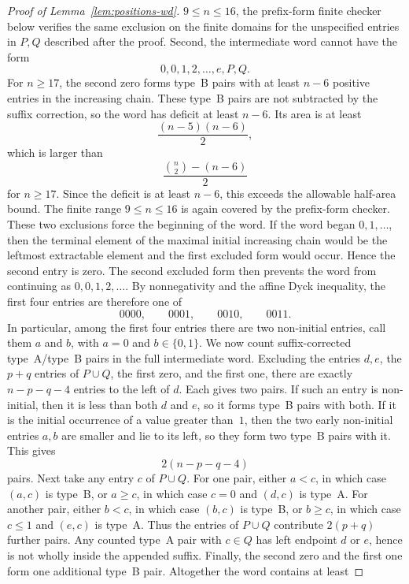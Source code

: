 \documentclass[11pt]{article}
\theoremstyle{plain}
\theoremstyle{definition}
\theoremstyle{remark}
\begin{document}
\begin{proof}[Proof of Lemma~\ref{lem:positions-wd}]
\(9\le n\le 16\), the prefix-form finite checker below verifies the same
exclusion on the finite domains for the unspecified entries in \(P,Q\)
described after the proof.
Second, the intermediate word cannot have the form
\[
  0,0,1,2,\ldots,e,P,Q.
\]
For \(n\ge 17\), the second zero forms type~B pairs with at least \(n-6\)
positive entries in the increasing chain.  These type~B pairs are not
subtracted by the suffix correction, so the word has deficit at least
\(n-6\).  Its area is at least
\[
  \frac{(n-5)(n-6)}2,
\]
which is larger than
\[
  \frac{\binom n2-(n-6)}2
\]
for \(n\ge 17\).  Since the deficit is at least \(n-6\), this exceeds
the allowable half-area bound.  The finite range \(9\le n\le 16\) is again
covered by the prefix-form checker.
These two exclusions force the beginning of the word.  If the word began
\(0,1,\ldots\), then the terminal element of the maximal initial increasing
chain would be the leftmost extractable element and the first excluded form
would occur.  Hence the second entry is zero.  The second excluded form then
prevents the word from continuing as \(0,0,1,2,\ldots\).  By nonnegativity and
the affine Dyck inequality, the first four entries are therefore one of
\[
  0000,
  \qquad
  0001,
  \qquad
  0010,
  \qquad
  0011.
\]
In particular, among the first four entries there are two non-initial entries,
call them \(a\) and \(b\), with \(a=0\) and \(b\in\{0,1\}\).
We now count suffix-corrected type~A/type~B pairs in the full intermediate
word.  Excluding the entries \(d,e\), the \(p+q\) entries of \(P\cup Q\), the
first zero, and the first one, there are exactly \(n-p-q-4\) entries to the
left of \(d\).  Each gives two pairs.  If such an entry is non-initial, then
it is less than both
\(d\) and \(e\), so it forms type~B pairs with both.  If it is the initial
occurrence of a value greater than~\(1\), then the two early non-initial entries
\(a,b\) are smaller and lie to its left, so they form two type~B pairs with it.
This gives
\[
  2(n-p-q-4)
\]
pairs.
Next take any entry \(c\) of \(P\cup Q\).  For one pair, either \(a<c\), in
which case \((a,c)\) is type~B, or \(a\ge c\), in which case \(c=0\) and
\((d,c)\) is type~A.  For another pair, either \(b<c\), in which case
\((b,c)\) is type~B, or \(b\ge c\), in which case \(c\le 1\) and \((e,c)\) is
type~A.  Thus the entries of \(P\cup Q\) contribute \(2(p+q)\) further pairs.
Any counted type~A pair with \(c\in Q\) has left endpoint \(d\) or \(e\), hence
is not wholly inside the appended suffix.
Finally, the second zero and the first one form one additional type~B pair.
Altogether the word contains at least

\end{proof}
\end{document}

